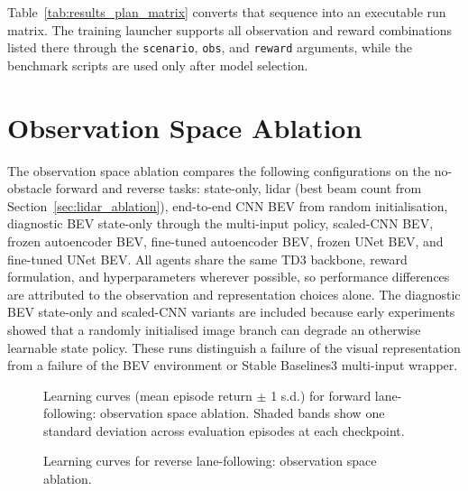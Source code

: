 Table~\ref{tab:results_plan_matrix} converts that sequence into an executable run matrix. The training launcher supports all observation and reward combinations listed there through the \texttt{scenario}, \texttt{obs}, and \texttt{reward} arguments, while the benchmark scripts are used only after model selection.



\section{Observation Space Ablation}
\label{sec:obs_ablation}

The observation space ablation compares the following configurations on the no-obstacle forward and reverse tasks: state-only, lidar (best beam count from Section~\ref{sec:lidar_ablation}), end-to-end CNN BEV from random initialisation, diagnostic BEV state-only through the multi-input policy, scaled-CNN BEV, frozen autoencoder BEV, fine-tuned autoencoder BEV, frozen UNet BEV, and fine-tuned UNet BEV. All agents share the same TD3 backbone, reward formulation, and hyperparameters wherever possible, so performance differences are attributed to the observation and representation choices alone. The diagnostic BEV state-only and scaled-CNN variants are included because early experiments showed that a randomly initialised image branch can degrade an otherwise learnable state policy. These runs distinguish a failure of the visual representation from a failure of the BEV environment or Stable Baselines3 multi-input wrapper.

\begin{figure}[H]
    \centering
    \caption{Learning curves (mean episode return $\pm$ 1 s.d.) for forward lane-following:
             observation space ablation. Shaded bands show one standard deviation
             across evaluation episodes at each checkpoint.}
    \label{fig:forward_obs_ablation}
\end{figure}

\begin{figure}[H]
    \centering
    \caption{Learning curves for reverse lane-following: observation space ablation.}
    \label{fig:reverse_obs_ablation}
\end{figure}

